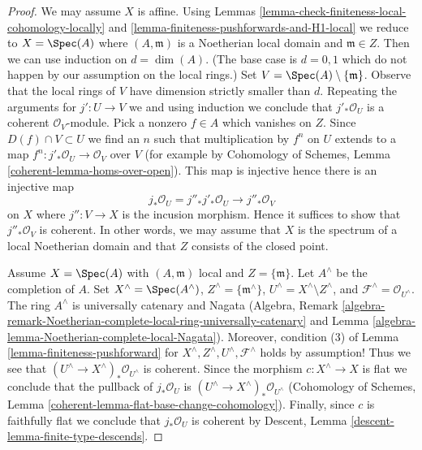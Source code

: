 \begin{proof}
We may assume $X$ is affine.
Using Lemmas \ref{lemma-check-finiteness-local-cohomology-locally} and
\ref{lemma-finiteness-pushforwards-and-H1-local} we reduce to
$X = \Spec(A)$ where $(A, \mathfrak m)$ is a Noetherian local domain
and $\mathfrak m \in Z$.
Then we can use induction on $d = \dim(A)$.
(The base case is $d = 0, 1$ which do not happen by
our assumption on the local rings.)
Set $V = \Spec(A) \setminus \{\mathfrak m\}$.
Observe that the local rings of $V$ have dimension strictly smaller than $d$.
Repeating the arguments for $j' : U \to V$ we
and using induction we conclude that $j'_*\mathcal{O}_U$ is
a coherent $\mathcal{O}_V$-module.
Pick a nonzero $f \in A$ which vanishes on $Z$.
Since $D(f) \cap V \subset U$ we find an $n$ such that
multiplication by $f^n$ on $U$ extends to a map
$f^n : j'_*\mathcal{O}_U \to \mathcal{O}_V$ over $V$
(for example by Cohomology of Schemes, Lemma
\ref{coherent-lemma-homs-over-open}). This map is injective
hence there is an injective map
$$
j_*\mathcal{O}_U = j''_* j'_* \mathcal{O}_U \to j''_*\mathcal{O}_V
$$
on $X$ where $j'' : V \to X$ is the incusion morphism.
Hence it suffices to show that $j''_*\mathcal{O}_V$ is coherent.
In other words, we may assume that $X$ is the spectrum
of a local Noetherian domain and that $Z$
consists of the closed point.

\medskip\noindent
Assume $X = \Spec(A)$ with $(A, \mathfrak m)$ local and $Z = \{\mathfrak m\}$.
Let $A^\wedge$ be the completion of $A$.
Set $X^\wedge = \Spec(A^\wedge)$, $Z^\wedge = \{\mathfrak m^\wedge\}$,
$U^\wedge = X^\wedge \setminus Z^\wedge$, and
$\mathcal{F}^\wedge = \mathcal{O}_{U^\wedge}$.
The ring $A^\wedge$ is universally catenary and Nagata (Algebra, Remark
\ref{algebra-remark-Noetherian-complete-local-ring-universally-catenary} and
Lemma \ref{algebra-lemma-Noetherian-complete-local-Nagata}).
Moreover, condition (3) of Lemma \ref{lemma-finiteness-pushforward}
for $X^\wedge, Z^\wedge, U^\wedge, \mathcal{F}^\wedge$
holds by assumption! Thus we see that
$(U^\wedge \to X^\wedge)_*\mathcal{O}_{U^\wedge}$
is coherent. Since the morphism $c : X^\wedge \to X$
is flat we conclude that the pullback of $j_*\mathcal{O}_U$ is
$(U^\wedge \to X^\wedge)_*\mathcal{O}_{U^\wedge}$
(Cohomology of Schemes, Lemma
\ref{coherent-lemma-flat-base-change-cohomology}).
Finally, since $c$ is faithfully flat we conclude that
$j_*\mathcal{O}_U$ is coherent by
Descent, Lemma \ref{descent-lemma-finite-type-descends}.
\end{proof}

